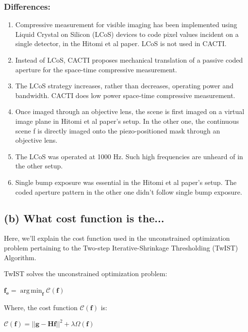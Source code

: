 \documentclass[fleqn, 11pt]{article}
\DeclareMathOperator*{\argmin}{arg\,min}
\begin{document}
\subsubsection*{Differences:}
\begin{enumerate}
    \item Compressive measurement for visible imaging has been implemented using Liquid Crystal on
    Silicon (LCoS) devices to code pixel values incident on a single detector, in the Hitomi et al paper. LCoS is not used in CACTI.
    \item Instead of LCoS, CACTI proposes mechanical translation of a passive coded aperture for 
    the space-time compressive measurement.
    \item The LCoS strategy increases, rather than decreases, operating power and
    bandwidth. CACTI does low power space-time compressive measurement.
    \item Once imaged through an objective lens, the scene is first imaged 
    on a virtual image plane in Hitomi et al paper's setup. In the other one, the continuous scene f is directly imaged onto the piezo-positioned mask through an objective lens.
    \item The LCoS was operated at 1000 Hz. Such high frequencies are unheard of
    in the other setup. 
    \item Single bump exposure was essential in the Hitomi et al paper's setup. The coded aperture pattern in the other one didn't follow single bump exposure. 
\end{enumerate}


\newpage

\subsection*{(b) What cost function is the...}

Here, we'll explain the cost function used in the unconstrained optimization problem pertaining to the \textsf{Two-step Iterative-Shrinkage Thresholding} (TwIST) Algorithm.

TwIST solves the unconstrained optimization problem: 

\begin{center}
    $\mathbf{f_e}= \displaystyle \argmin_{\mathbf{f}}   \mathcal{C}(\mathbf{f}) $
\end{center}

Where, the cost function $\mathcal{C}(\mathbf{f})$ is:

\begin{center}
    $ \mathcal{C}(\mathbf{f}) = ||\mathbf{g - Hf} ||^2 + \lambda \Omega(\mathbf{f})$
\end{center}
\end{document}
